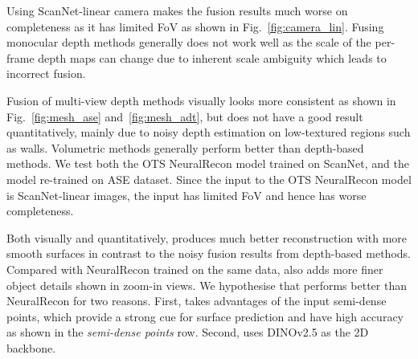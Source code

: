 \renewcommand{\subfigwidth}{0.24}


Using ScanNet-linear camera makes the fusion results much worse on completeness as it has limited FoV as shown in Fig.~\ref{fig:camera_lin}.
Fusing monocular depth methods generally does not work well as the scale of the per-frame depth maps can change due to inherent scale ambiguity which leads to incorrect fusion. 

Fusion of multi-view depth methods visually looks more consistent as shown in Fig.~\ref{fig:mesh_ase} and~\ref{fig:mesh_adt}, but does not have a good result quantitatively, mainly due to noisy depth estimation on low-textured regions such as walls. 
Volumetric methods generally perform better than depth-based methods. We test both the OTS NeuralRecon model trained on ScanNet, and the model re-trained on ASE dataset. Since the input to the OTS NeuralRecon model is ScanNet-linear images, the input has limited FoV and hence has worse completeness.

Both visually and quantitatively, \EFMmodel{} produces much better reconstruction with more smooth surfaces in contrast to the noisy fusion results from depth-based methods. Compared with NeuralRecon trained on the same data, \EFMmodel{} also adds more finer object details shown in zoom-in views.
We hypothesise that \EFMmodel{} performs better than NeuralRecon for two reasons. First, \EFMmodel{} takes advantages of the input semi-dense points, which provide a strong cue for surface prediction and have high accuracy as shown in the \textit{semi-dense points} row. Second, \EFMmodel{} uses DINOv2.5 as the 2D backbone.
%








